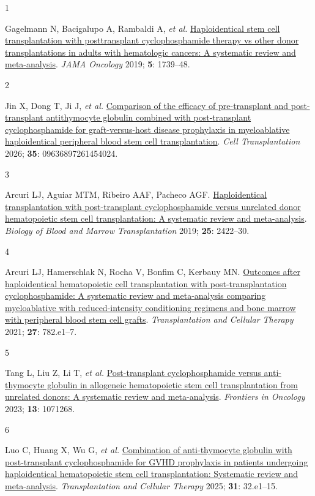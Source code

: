 \documentclass[
  british,
  8.6pt,
  a4paper,
  twocolumn]{article}
\newlength{\cslhangindent}
\newlength{\csllabelwidth}
\newenvironment{CSLReferences}[2] %
 {\begin{list}{}{%
  \setlength{\itemindent}{0pt}
  \setlength{\leftmargin}{0pt}
  \setlength{\parsep}{0pt}
  \ifodd #1
   \setlength{\leftmargin}{\cslhangindent}
   \setlength{\itemindent}{-1\cslhangindent}
  \fi
  \setlength{\itemsep}{#2\baselineskip}}}
 {\end{list}}
\newcommand{\CSLLeftMargin}[1]{\parbox[t]{\csllabelwidth}{\strut#1\strut}}
\newcommand{\CSLRightInline}[1]{\parbox[t]{\linewidth - \csllabelwidth}{\strut#1\strut}}
\begin{document}
\protect{}\label{refs}
\begin{CSLReferences}{0}{1}
\CSLLeftMargin{1 }%
\CSLRightInline{Gagelmann N, Bacigalupo A, Rambaldi A, \emph{et al.}
\href{https://doi.org/10.1001/jamaoncol.2019.3541}{Haploidentical stem
cell transplantation with posttransplant cyclophosphamide therapy vs
other donor transplantations in adults with hematologic cancers: A
systematic review and meta-analysis}. \emph{JAMA Oncology} 2019;
\textbf{5}: 1739--48.}

\CSLLeftMargin{2 }%
\CSLRightInline{Jin X, Dong T, Ji J, \emph{et al.}
\href{https://doi.org/10.1177/09636897261454024}{Comparison of the
efficacy of pre-transplant and post-transplant antithymocyte globulin
combined with post-transplant cyclophosphamide for graft-versus-host
disease prophylaxis in myeloablative haploidentical peripheral blood
stem cell transplantation}. \emph{Cell Transplantation} 2026;
\textbf{35}: 09636897261454024.}

\CSLLeftMargin{3 }%
\CSLRightInline{Arcuri LJ, Aguiar MTM, Ribeiro AAF, Pacheco AGF.
\href{https://doi.org/10.1016/j.bbmt.2019.07.028}{Haploidentical
transplantation with post-transplant cyclophosphamide versus unrelated
donor hematopoietic stem cell transplantation: A systematic review and
meta-analysis}. \emph{Biology of Blood and Marrow Transplantation} 2019;
\textbf{25}: 2422--30.}

\CSLLeftMargin{4 }%
\CSLRightInline{Arcuri LJ, Hamerschlak N, Rocha V, Bonfim C, Kerbauy MN.
\href{https://doi.org/10.1016/j.jtct.2021.06.011}{Outcomes after
haploidentical hematopoietic cell transplantation with
post-transplantation cyclophosphamide: A systematic review and
meta-analysis comparing myeloablative with reduced-intensity
conditioning regimens and bone marrow with peripheral blood stem cell
grafts}. \emph{Transplantation and Cellular Therapy} 2021; \textbf{27}:
782.e1--7.}

\CSLLeftMargin{5 }%
\CSLRightInline{Tang L, Liu Z, Li T, \emph{et al.}
\href{https://doi.org/10.3389/fonc.2023.1071268}{Post-transplant
cyclophosphamide versus anti-thymocyte globulin in allogeneic
hematopoietic stem cell transplantation from unrelated donors: A
systematic review and meta-analysis}. \emph{Frontiers in Oncology} 2023;
\textbf{13}: 1071268.}

\CSLLeftMargin{6 }%
\CSLRightInline{Luo C, Huang X, Wu G, \emph{et al.}
\href{https://doi.org/10.1016/j.jtct.2024.07.017}{Combination of
anti-thymocyte globulin with post-transplant cyclophosphamide for GVHD
prophylaxis in patients undergoing haploidentical hematopoietic stem
cell transplantation: Systematic review and meta-analysis}.
\emph{Transplantation and Cellular Therapy} 2025; \textbf{31}:
32.e1--15.}


\end{CSLReferences}
\end{document}
